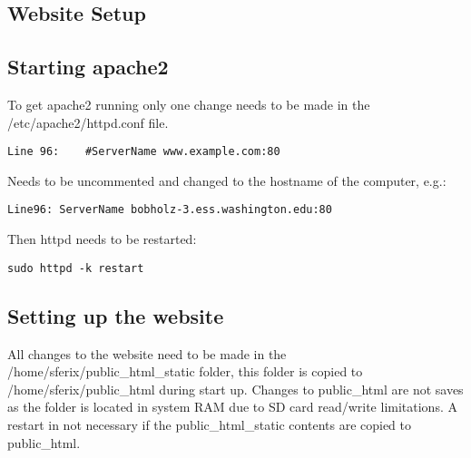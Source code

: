 \begin{centering}
\section*{Website Setup}
\end{centering}

\subsection*{Starting apache2}

To get apache2 running only one change needs to be made in the /etc/apache2/httpd.conf file.

\begin{verbatim}
Line 96:	#ServerName www.example.com:80
\end{verbatim}

Needs to be uncommented and changed to the hostname of the computer, e.g.:

\begin{verbatim}
Line96:	ServerName bobholz-3.ess.washington.edu:80
\end{verbatim}

Then httpd needs to be restarted:

\begin{verbatim}
sudo httpd -k restart
\end{verbatim}

\subsection*{Setting up the website}

All changes to the website need to be made in the /home/sferix/public\_html\_static folder, this folder is copied to /home/sferix/public\_html during start up.
Changes to public\_html are not saves as the folder is located in system RAM due to SD card read/write limitations.
A restart in not necessary if the public\_html\_static contents are copied to public\_html.


